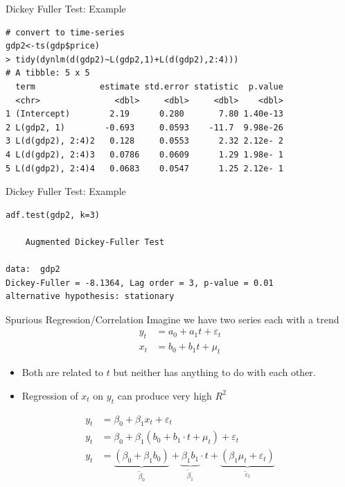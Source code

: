 \begin{frame}[fragile]{Dickey Fuller Test: Example}
\small
\begin{verbatim}
# convert to time-series
gdp2<-ts(gdp$price)
> tidy(dynlm(d(gdp2)~L(gdp2,1)+L(d(gdp2),2:4)))
# A tibble: 5 x 5
  term             estimate std.error statistic  p.value
  <chr>               <dbl>     <dbl>     <dbl>    <dbl>
1 (Intercept)        2.19      0.280       7.80 1.40e-13
2 L(gdp2, 1)        -0.693     0.0593    -11.7  9.98e-26
3 L(d(gdp2), 2:4)2   0.128     0.0553      2.32 2.12e- 2
4 L(d(gdp2), 2:4)3   0.0786    0.0609      1.29 1.98e- 1
5 L(d(gdp2), 2:4)4   0.0683    0.0547      1.25 2.12e- 1
\end{verbatim}
\end{frame}


\begin{frame}[fragile]{Dickey Fuller Test: Example}
\small
\begin{verbatim}
adf.test(gdp2, k=3)

    Augmented Dickey-Fuller Test

data:  gdp2
Dickey-Fuller = -8.1364, Lag order = 3, p-value = 0.01
alternative hypothesis: stationary
\end{verbatim}
\end{frame}


\begin{frame}{Spurious Regression/Correlation}
Imagine we have two series each with a trend
\begin{align*}
y_{t} &= a_0 + a_1 t + \varepsilon_{t}\\
x_{t} &= b_0 + b_1 t + \mu_{t}
\end{align*}
\begin{itemize}
    \item Both are related to $t$ but neither has anything to do with each other.
    \item Regression of $x_t$ on $y_t$ can produce very high $R^2$
\end{itemize}
\begin{align*}
y_{t} &= \beta_0  + \beta_1 x_{t} + \varepsilon_t\\
y_{t} &= \beta_0  + \beta_1 (b_0 + b_1 \cdot t + \mu_t) + \varepsilon_t\\
y_{t} &= \underbrace{(\beta_0  + \beta_1 b_0)}_{\widetilde{\beta}_0}  + \underbrace{\beta_1 b_1}_{\widetilde{\beta}_1} \cdot t + \underbrace{(\beta_1 \mu_t+ \varepsilon_t)}_{\widetilde{\varepsilon}_t}\\
\end{align*}
\end{frame}

